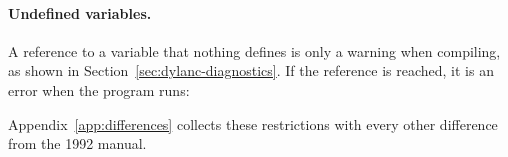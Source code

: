 \paragraph{Undefined variables.}
A reference to a variable that nothing defines is only a warning when
compiling, as shown in Section~\ref{sec:dylanc-diagnostics}. If the
reference is reached, it is an error when the program runs:


Appendix~\ref{app:differences} collects these restrictions with every
other difference from the 1992 manual.

\fussy
